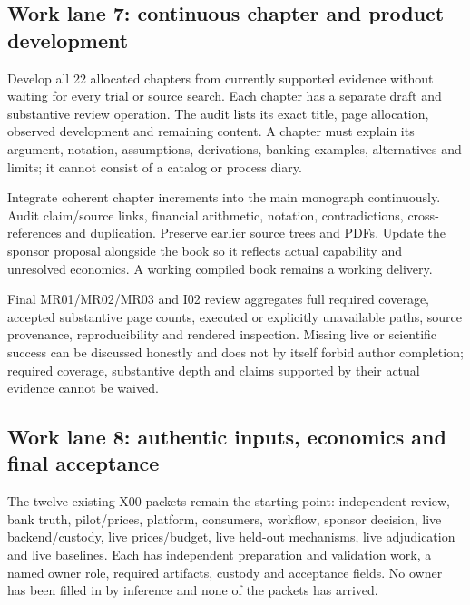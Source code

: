 \documentclass[
  10pt,
]{article}
\begin{document}
\hypertarget{work-lane-7-continuous-chapter-and-product-development}{%
\subsection{Work lane 7: continuous chapter and product
development}\label{work-lane-7-continuous-chapter-and-product-development}}

Develop all 22 allocated chapters from currently supported evidence
without waiting for every trial or source search. Each chapter has a
separate draft and substantive review operation. The audit lists its
exact title, page allocation, observed development and remaining
content. A chapter must explain its argument, notation, assumptions,
derivations, banking examples, alternatives and limits; it cannot
consist of a catalog or process diary.

Integrate coherent chapter increments into the main monograph
continuously. Audit claim/source links, financial arithmetic, notation,
contradictions, cross-references and duplication. Preserve earlier
source trees and PDFs. Update the sponsor proposal alongside the book so
it reflects actual capability and unresolved economics. A working
compiled book remains a working delivery.

Final MR01/MR02/MR03 and I02 review aggregates full required coverage,
accepted substantive page counts, executed or explicitly unavailable
paths, source provenance, reproducibility and rendered inspection.
Missing live or scientific success can be discussed honestly and does
not by itself forbid author completion; required coverage, substantive
depth and claims supported by their actual evidence cannot be waived.

\hypertarget{work-lane-8-authentic-inputs-economics-and-final-acceptance}{%
\subsection{Work lane 8: authentic inputs, economics and final
acceptance}\label{work-lane-8-authentic-inputs-economics-and-final-acceptance}}

The twelve existing X00 packets remain the starting point: independent
review, bank truth, pilot/prices, platform, consumers, workflow, sponsor
decision, live backend/custody, live prices/budget, live held-out
mechanisms, live adjudication and live baselines. Each has independent
preparation and validation work, a named owner role, required artifacts,
custody and acceptance fields. No owner has been filled in by inference
and none of the packets has arrived.
\end{document}
